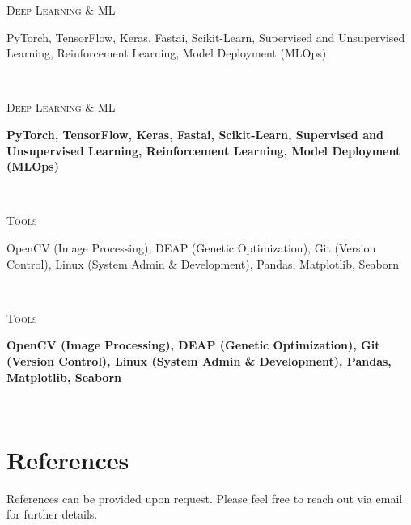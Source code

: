 \documentclass[letterpaper,
		10pt]{article}
\newcommand{\entry}[4]{
\ifthenelse{\isempty{#3}}
{\slimentry{#1}{#2}}{

\begin{minipage}[t]{.15\linewidth}
\hfill \textsc{#1}
\end{minipage}
\hfill\vline\hfill
\begin{minipage}[t]{.80\linewidth}
{\bf#2}\\\textit{#3} \footnotesize{#4}
\end{minipage}\\
\vspace{.2cm}
}}
\newcommand{\slimentry}[2]{

\begin{minipage}[t]{.15\linewidth}
\hfill \textsc{#1}
\end{minipage}
\hfill\vline\hfill
\begin{minipage}[t]{.80\linewidth}
#2
\end{minipage}\\
\vspace{.25cm}
}%
\begin{document}
\entry{Deep Learning \& ML}
    {PyTorch, TensorFlow, Keras, Fastai, Scikit-Learn, Supervised and Unsupervised Learning, Reinforcement Learning, Model Deployment (MLOps)}
    {}
    {}

\entry{Tools}
    {OpenCV (Image Processing), DEAP (Genetic Optimization), Git (Version Control), Linux (System Admin \& Development), Pandas, Matplotlib, Seaborn}
    {}
    {}

%


\section{References}
%
References can be provided upon request. Please feel free to reach out via email for further details. 
\end{document}
